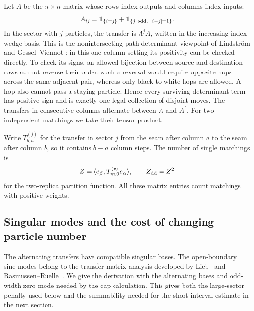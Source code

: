 Let $A$ be the $n\times n$ matrix whose rows index outputs and columns
index inputs:
\begin{equation}\label{eq:one-particle-transfer}
 A_{ij}=\mathbf 1_{\{i=j\}}
       +\mathbf 1_{\{j\ \mathrm{odd},\ |i-j|=1\}}.
\end{equation}
In the sector with $j$ particles, the transfer is $\Lambda^j A$, written
in the increasing-index wedge basis. This is the nonintersecting-path
determinant viewpoint of Lindstr\"om and Gessel--Viennot
\cite{Lindstrom,GV}; in this one-column setting its positivity can be
checked directly. To check its signs, an allowed
bijection between source and destination rows cannot reverse their order:
such a reversal would require opposite hops across the same adjacent
pair, whereas only black-to-white hops are allowed.  A hop also cannot
pass a staying particle.  Hence every surviving determinant term has
positive sign and is exactly one legal collection of disjoint moves.
The transfers in consecutive columns alternate between $A$ and $A^*$.
For two independent matchings we take their tensor product.

Write $T^{(j)}_{b,a}$ for the transfer in sector $j$ from the seam after
column $a$ to the seam after column $b$, so it contains $b-a$ column
steps.  The number of single matchings is
\[
 Z=\langle e_\beta,T^{(p)}_{m,0}e_\alpha\rangle,
 \qquad Z_{\rm dd}=Z^2
\]
for the two-replica partition function.  All these matrix entries count
matchings with positive weights.

\subsection{Singular modes and the cost of changing particle number}

The alternating transfers have compatible singular bases. The
open-boundary sine modes belong to the transfer-matrix analysis developed
by Lieb~\cite{Lieb} and Rasmussen--Ruelle~\cite[Section~IV~A]{RR}.
We give the derivation with the alternating bases and odd-width zero mode
needed by the cap calculation. This gives
both the large-sector penalty used below and the summability needed for
the short-interval estimate in the next section.

